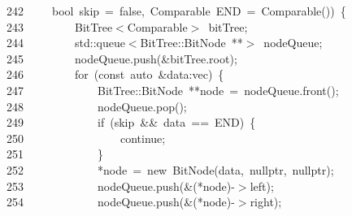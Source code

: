 \documentclass[11pt,a4paper]{ctexart}
\newcommand{\hlstd}[1]{\textcolor[rgb]{0.2,0.2,0.2}{#1}}
\newcommand{\hlopt}[1]{\textcolor[rgb]{0.2,0.2,0.2}{#1}}
\newcommand{\hllin}[1]{\textcolor[rgb]{0.59,0.59,0.59}{#1}}
\newcommand{\hlkwa}[1]{\textcolor[rgb]{0.23,0.42,0.78}{#1}}
\newcommand{\hlkwb}[1]{\textcolor[rgb]{0.63,0,0.31}{#1}}
\newcommand{\hlkwc}[1]{\textcolor[rgb]{0,0.63,0.31}{#1}}
\newcommand{\hlkwd}[1]{\textcolor[rgb]{0.78,0.23,0.41}{#1}}
\begin{document}
\hllin{242\ }\hlstd{}\hlstd{\ \ \ \ }\hlstd{}\hlkwb{bool\ }\hlstd{skip\ }\hlopt{=\ }\hlstd{}\hlkwa{false}\hlstd{}\hlopt{,\ }\hlstd{Comparable\ END\ }\hlopt{=\ }\hlstd{}\hlkwd{Comparable}\hlstd{}\hlopt{())\ \{}\\
\hllin{243\ }\hlstd{}\hlstd{\ \ \ \ \ \ \ \ }\hlstd{BitTree}\hlopt{$<$}\hlstd{Comparable}\hlopt{$>$\ }\hlstd{bitTree}\hlopt{;}\\
\hllin{244\ }\hlstd{}\hlstd{\ \ \ \ \ \ \ \ }\hlstd{}\hlkwc{std}\hlstd{}\hlopt{::}\hlstd{queue}\hlopt{$<$}\hlstd{}\hlkwc{BitTree}\hlstd{}\hlopt{::}\hlstd{BitNode\ }\hlopt{{*}{*}$>$\ }\hlstd{nodeQueue}\hlopt{;}\\
\hllin{245\ }\hlstd{}\hlstd{\ \ \ \ \ \ \ \ }\hlstd{nodeQueue}\hlopt{.}\hlstd{}\hlkwd{push}\hlstd{}\hlopt{(\&}\hlstd{bitTree}\hlopt{.}\hlstd{root}\hlopt{);}\\
\hllin{246\ }\hlstd{}\hlstd{\ \ \ \ \ \ \ \ }\hlstd{}\hlkwa{for\ }\hlstd{}\hlopt{(}\hlstd{}\hlkwb{const\ }\hlstd{}\hlkwc{auto\ }\hlstd{}\hlopt{\&}\hlstd{data}\hlopt{:}\hlstd{vec}\hlopt{)\ \{}\\
\hllin{247\ }\hlstd{}\hlstd{\ \ \ \ \ \ \ \ \ \ \ \ }\hlstd{}\hlkwc{BitTree}\hlstd{}\hlopt{::}\hlstd{BitNode\ }\hlopt{{*}{*}}\hlstd{node\ }\hlopt{=\ }\hlstd{nodeQueue}\hlopt{.}\hlstd{}\hlkwd{front}\hlstd{}\hlopt{();}\\
\hllin{248\ }\hlstd{}\hlstd{\ \ \ \ \ \ \ \ \ \ \ \ }\hlstd{nodeQueue}\hlopt{.}\hlstd{}\hlkwd{pop}\hlstd{}\hlopt{();}\\
\hllin{249\ }\hlstd{}\hlstd{\ \ \ \ \ \ \ \ \ \ \ \ }\hlstd{}\hlkwa{if\ }\hlstd{}\hlopt{(}\hlstd{skip\ }\hlopt{\&\&\ }\hlstd{data\ }\hlopt{==\ }\hlstd{END}\hlopt{)\ \{}\\
\hllin{250\ }\hlstd{}\hlstd{\ \ \ \ \ \ \ \ \ \ \ \ \ \ \ \ }\hlstd{}\hlkwa{continue}\hlstd{}\hlopt{;}\\
\hllin{251\ }\hlstd{}\hlstd{\ \ \ \ \ \ \ \ \ \ \ \ }\hlstd{}\hlopt{\}}\\
\hllin{252\ }\hlstd{}\hlstd{\ \ \ \ \ \ \ \ \ \ \ \ }\hlstd{}\hlopt{{*}}\hlstd{node\ }\hlopt{=\ }\hlstd{}\hlkwa{new\ }\hlstd{}\hlkwd{BitNode}\hlstd{}\hlopt{(}\hlstd{data}\hlopt{,\ }\hlstd{}\hlkwc{nullptr}\hlstd{}\hlopt{,\ }\hlstd{}\hlkwc{nullptr}\hlstd{}\hlopt{);}\\
\hllin{253\ }\hlstd{}\hlstd{\ \ \ \ \ \ \ \ \ \ \ \ }\hlstd{nodeQueue}\hlopt{.}\hlstd{}\hlkwd{push}\hlstd{}\hlopt{(\&({*}}\hlstd{node}\hlopt{){-}$>$}\hlstd{left}\hlopt{);}\\
\hllin{254\ }\hlstd{}\hlstd{\ \ \ \ \ \ \ \ \ \ \ \ }\hlstd{nodeQueue}\hlopt{.}\hlstd{}\hlkwd{push}\hlstd{}\hlopt{(\&({*}}\hlstd{node}\hlopt{){-}$>$}\hlstd{right}\hlopt{);}\\
\end{document}
